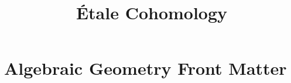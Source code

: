 \documentclass[11pt]{book}
\numberwithin{equation}{section}
\theoremstyle{plain} %
\theoremstyle{definition}
\begin{document}
\title{\'Etale Cohomology}

\maketitle

\tableofcontents
{}



\part{Algebraic Geometry Front Matter}










\end{document}
